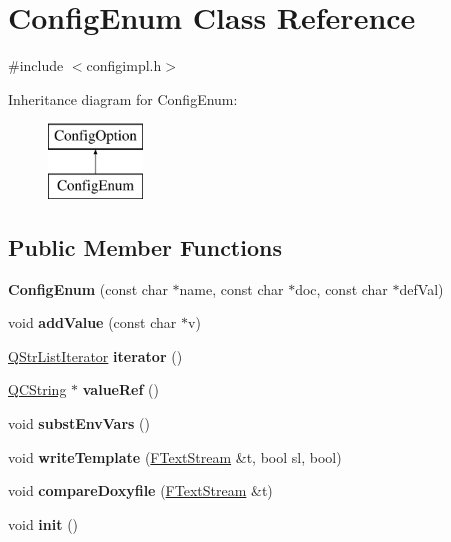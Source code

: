 \hypertarget{class_config_enum}{}\section{Config\+Enum Class Reference}
\label{class_config_enum}


{\ttfamily \#include $<$configimpl.\+h$>$}

Inheritance diagram for Config\+Enum\+:\begin{figure}[H]
\begin{center}
\leavevmode
\includegraphics[height=2.000000cm]{class_config_enum}
\end{center}
\end{figure}
\subsection*{Public Member Functions}
\begin{DoxyCompactItemize}
\item 
\mbox{\label{class_config_enum_a96e17cf6e6f6e69461f8a19e3f29b421}} 
{\bfseries Config\+Enum} (const char $\ast$name, const char $\ast$doc, const char $\ast$def\+Val)
\item 
\mbox{\label{class_config_enum_a6131fd01c26d5adbe380a9a6832c3ff1}} 
void {\bfseries add\+Value} (const char $\ast$v)
\item 
\mbox{\label{class_config_enum_abcf14150c3349019fe2b703590ad906e}} 
\mbox{\hyperlink{class_q_internal_list_iterator}{Q\+Str\+List\+Iterator}} {\bfseries iterator} ()
\item 
\mbox{\label{class_config_enum_a75b1e30ba1f89523fb342af4ef851a29}} 
\mbox{\hyperlink{class_q_c_string}{Q\+C\+String}} $\ast$ {\bfseries value\+Ref} ()
\item 
\mbox{\label{class_config_enum_a6bce69a7f2e47d115ad136e56aca8158}} 
void {\bfseries subst\+Env\+Vars} ()
\item 
\mbox{\label{class_config_enum_aa739cce5633d2e75298bef0f6cf7c84c}} 
void {\bfseries write\+Template} (\mbox{\hyperlink{class_f_text_stream}{F\+Text\+Stream}} \&t, bool sl, bool)
\item 
\mbox{\label{class_config_enum_ad74495f3a025411b5af5ebabf0b1e415}} 
void {\bfseries compare\+Doxyfile} (\mbox{\hyperlink{class_f_text_stream}{F\+Text\+Stream}} \&t)
\item 
\mbox{\label{class_config_enum_af827841fdcc6612dd7ff2fb6ec92eaad}} 
void {\bfseries init} ()
\end{DoxyCompactItemize}
